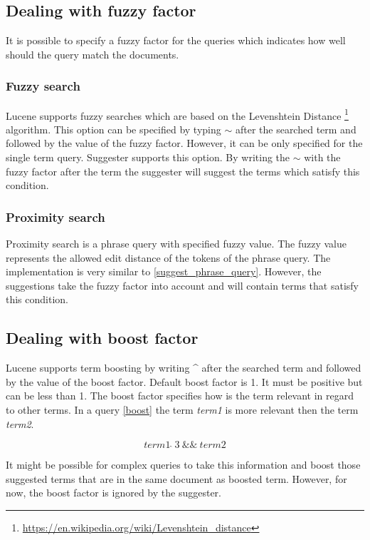 \subsection{Dealing with fuzzy factor}
It is possible to specify a fuzzy factor for the queries which indicates how well should the query match the documents.

\subsubsection{Fuzzy search}
Lucene supports fuzzy searches which are based on the Levenshtein Distance
\footnote{\url{https://en.wikipedia.org/wiki/Levenshtein_distance}} algorithm. This option can be specified by typing
$\sim$ after the searched term and followed by the value of the fuzzy factor. However, it can be only specified for the
single term query. Suggester supports this option. By writing the $\sim$ with the fuzzy factor after the term the
suggester will suggest the terms which satisfy this condition.

\subsubsection{Proximity search}
Proximity search is a phrase query with specified fuzzy value. The fuzzy value represents the allowed edit distance of the
tokens of the phrase query. The implementation is very similar to \ref{suggest_phrase_query}. However, the suggestions
take the fuzzy factor into account and will contain terms that satisfy this condition.

\subsection{Dealing with boost factor}
Lucene supports term boosting by writing \textbf{\^} after the searched term and followed by the value of the boost factor.
Default boost factor is 1. It must be positive but can be less than 1. The boost factor specifies how is the term relevant
in regard to other terms. In a query \ref{boost} the term \textit{term1} is more relevant then the term \textit{term2}.

\begin{equation}
\label{boost}
term1\ \hat{}\ 3\ \&\&\ term2
\end{equation}

It might be possible for complex queries to take this information and boost those suggested terms that are in the same
document as boosted term. However, for now, the boost factor is ignored by the suggester.

